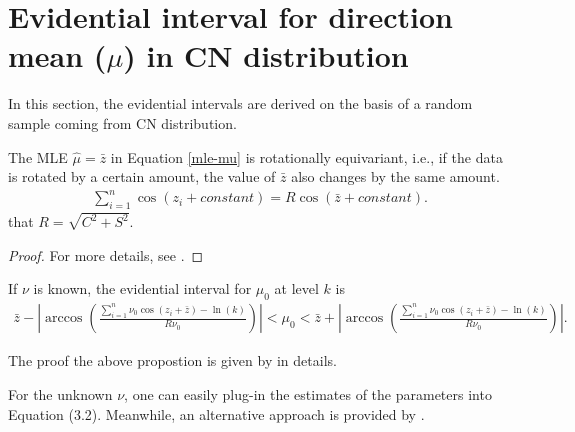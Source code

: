 \documentclass[twoside]{article}
\begin{document}
\section{Evidential interval for direction mean ($\mu$) in CN distribution}
In this section, the evidential intervals are derived on the basis of a random sample coming from CN distribution.
\begin{lem}
The MLE $\hat{\mu}=\bar{z}$ in Equation \eqref{mle-mu} is rotationally equivariant, i.e., if the data is rotated by a certain amount, the value of $\bar{z}$ also changes by the same amount.
\begin{eqnarray}
\sum_{i=1}^{n} \cos(z_i + constant)=R \cos(\bar{z}+constant).
\end{eqnarray}
that $ R=\sqrt{C^2+S^2}$.
\end{lem}
\begin{proof}
 For more details, see \cite{JS2001}.
\end{proof}
\begin{pro}
If $\nu$ is known, the evidential interval for $\mu_0$ at level $k$ is
\begin{eqnarray} \label{SIE}
\bar{z}-  \left| \arccos(\frac{\sum_{i=1}^{n} \nu_0 \cos(z_i + \bar{z})-\ln(k)}{R \nu_0 })\right| < \mu_0  < \bar{z} +\left| \arccos(\frac{\sum_{i=1}^{n} \nu_0 \cos(z_i + \bar{z})-\ln(k)}{R \nu_0 })\right| .
\end{eqnarray}
\end{pro}
The proof the above propostion is given by \cite{SDM2026b} in details.

For the unknown $\nu$, one can easily plug-in the estimates of the parameters into Equation (3.2). Meanwhile, an alternative approach is provided by \cite{SDM2026b}.
\end{document}
